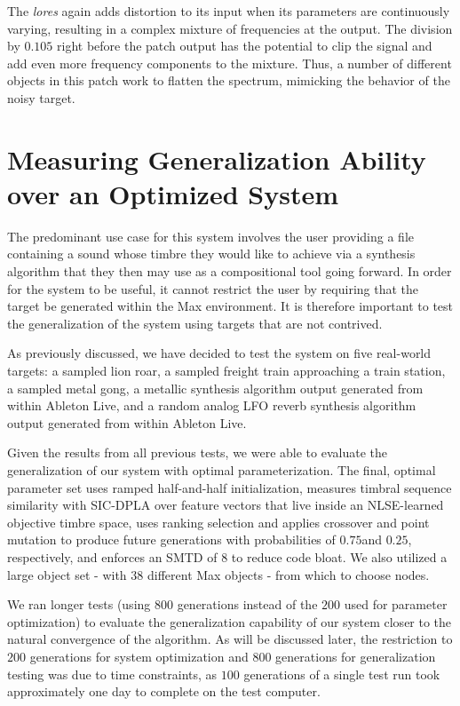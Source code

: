 \documentclass[a4paper,12pt]{report} 	%
\numberwithin{figure}{chapter}
\numberwithin{table}{chapter}
\numberwithin{equation}{chapter}
\begin{document}
\begin{flushleft}
The \emph{lores\texttildelow{}} again adds distortion to its input when its parameters are continuously varying, resulting in a complex mixture of frequencies at the output. The division by $0.105$ right before the patch output has the potential to clip the signal and add even more frequency components to the mixture. Thus, a number of different objects in this patch work to flatten the spectrum, mimicking the behavior of the noisy target.

\clearpage
\section{Measuring Generalization Ability over an Optimized System}

The predominant use case for this system involves the user providing a file containing a sound whose timbre they would like to achieve via a synthesis algorithm that they then may use as a compositional tool going forward. In order for the system to be useful, it cannot restrict the user by requiring that the target be generated within the Max environment. It is therefore important to test the generalization of the system using targets that are not contrived.

As previously discussed, we have decided to test the system on five real-world targets: a sampled lion roar, a sampled freight train approaching a train station, a sampled metal gong, a metallic synthesis algorithm output generated from within Ableton Live, and a random analog LFO reverb synthesis algorithm output generated from within Ableton Live.

Given the results from all previous tests, we were able to evaluate the generalization of our system with optimal parameterization. The final, optimal parameter set uses ramped half-and-half initialization, measures timbral sequence similarity with SIC-DPLA over feature vectors that live inside an NLSE-learned objective timbre space, uses ranking selection and applies crossover and point mutation to produce future generations with probabilities of $0.75$and $0.25$, respectively, and enforces an SMTD of $8$ to reduce code bloat. We also utilized a large object set - with $38$ different Max objects - from which to choose nodes.

We ran longer tests (using $800$ generations instead of the $200$ used for parameter optimization) to evaluate the generalization capability of our system closer to the natural convergence of the algorithm. As will be discussed later, the restriction to $200$ generations for system optimization and $800$ generations for generalization testing was due to time constraints, as $100$ generations of a single test run took approximately one day to complete on the test computer. 


\end{flushleft}
\end{document}
